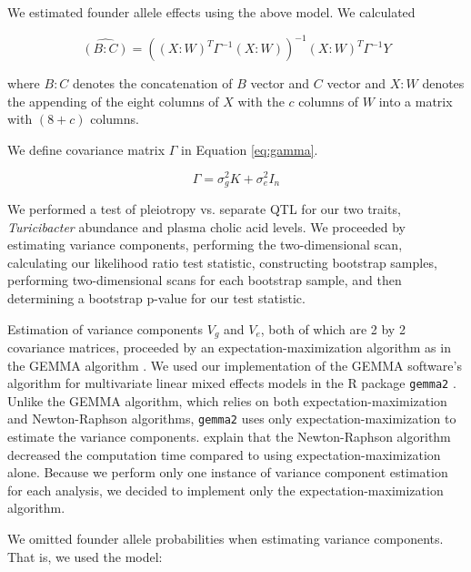 \documentclass[oneside]{book}
\begin{document}
We estimated founder allele effects using the above model. We calculated

\begin{equation}
\widehat{(B:C)} = \left((X:W)^T\Gamma^{-1}(X:W)\right)^{-1}(X:W)^T\Gamma^{-1}Y
\label{eq:allele-effects}
\end{equation}

where $B:C$ denotes the concatenation of $B$ vector and $C$ vector and $X:W$ denotes the appending of the eight columns of $X$ with the $c$ columns of $W$ into a matrix with $(8 + c)$ columns. 

We define covariance matrix $\Gamma$ in Equation \ref{eq:gamma}.

\begin{equation}
\Gamma = \sigma^2_g K + \sigma^2_e I_n
\label{eq:gamma}
\end{equation}


We performed a test of pleiotropy vs. separate QTL for our two traits, \emph{Turicibacter} abundance and plasma cholic acid levels. We proceeded by estimating variance components, performing the two-dimensional scan, calculating our likelihood ratio test statistic, constructing bootstrap samples, performing two-dimensional scans for each bootstrap sample, and then determining a bootstrap p-value for our test statistic.




Estimation of variance components $V_g$ and $V_e$, both of which are 2 by 2 covariance matrices, proceeded by an expectation-maximization algorithm as in the GEMMA algorithm \citep{zhou2014efficient}. We used our implementation of the GEMMA software's algorithm for multivariate linear mixed effects models in the R package \texttt{gemma2} \citep{gemma2}. Unlike the GEMMA algorithm, which relies on both expectation-maximization and Newton-Raphson algorithms, \texttt{gemma2} uses only expectation-maximization to estimate the variance components. \citet{zhou2014efficient} explain that the Newton-Raphson algorithm decreased the computation time compared to using expectation-maximization alone. Because we perform only one instance of variance component estimation for each analysis, we decided to implement only the expectation-maximization algorithm. 

We omitted founder allele probabilities when estimating variance components. That is, we used the model:
\end{document}
